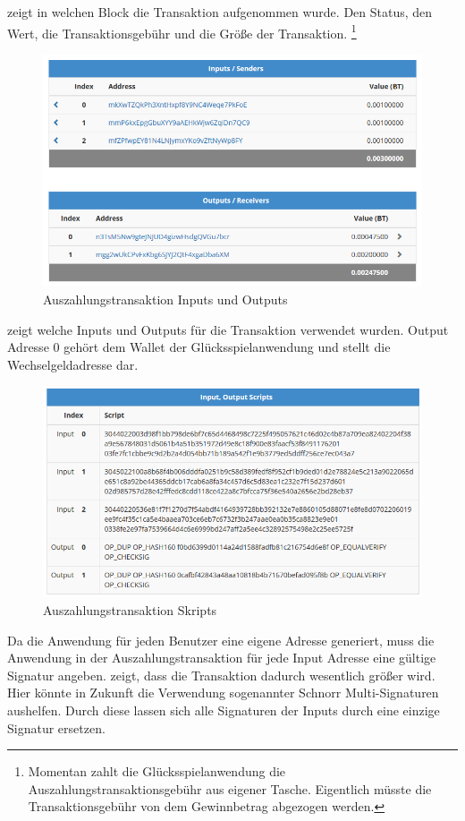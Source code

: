 \label{fig:btc_txn} zeigt in welchen Block die Transaktion aufgenommen wurde. Den Status, den Wert, die Transaktionsgebühr und die Größe der Transaktion.
\footnote{Momentan zahlt die Glücksspielanwendung die Auszahlungstransaktionsgebühr aus eigener Tasche. Eigentlich müsste die Transaktionsgebühr von dem Gewinnbetrag abgezogen werden.}

\begin{figure}[H]
\centering
\includegraphics[width=1\linewidth]{Figures/btc_gui/btc_txn_input_output}
\decoRule
\caption{Auszahlungstransaktion Inputs und Outputs}
\label{fig:btc_txn_input_output}
\end{figure}


\label{fig:btc_txn_input_output} zeigt welche Inputs und Outputs für die Transaktion verwendet wurden. Output Adresse 0 gehört dem Wallet der Glücksspielanwendung und stellt die Wechselgeldadresse dar.


\begin{figure}[H]
\centering
\includegraphics[width=1\linewidth]{Figures/btc_gui/btc_txn_input_output_scripts}
\decoRule
\caption{Auszahlungstransaktion Skripts}
\label{fig:btc_txn_input_output_scripts}
\end{figure}

Da die Anwendung für jeden Benutzer eine eigene Adresse generiert, muss die Anwendung in der Auszahlungstransaktion für jede Input Adresse eine gültige Signatur angeben.\label{fig:btc_txn_input_output_scripts} zeigt, dass die Transaktion dadurch wesentlich größer wird. Hier könnte in Zukunft die Verwendung sogenannter Schnorr Multi-Signaturen aushelfen. Durch diese lassen sich alle Signaturen der Inputs durch eine einzige Signatur ersetzen.